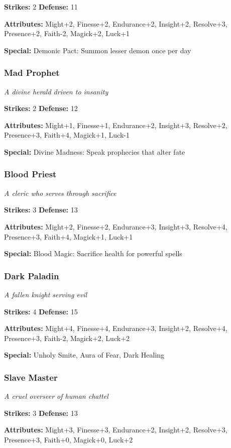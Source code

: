 \documentclass[10pt,twoside]{article}
\begin{document}
\textbf{Strikes:} 2 \quad \textbf{Defense:} 11

\textbf{Attributes:} Might+2, Finesse+2, Endurance+2, Insight+2, Resolve+3, Presence+2, Faith-2, Magick+2, Luck+1

\textbf{Special:} Demonic Pact: Summon lesser demon once per day

\subsubsection{Mad Prophet}
\textit{A divine herald driven to insanity}

\textbf{Strikes:} 2 \quad \textbf{Defense:} 12

\textbf{Attributes:} Might+1, Finesse+1, Endurance+2, Insight+3, Resolve+2, Presence+3, Faith+4, Magick+1, Luck-1

\textbf{Special:} Divine Madness: Speak prophecies that alter fate

\subsubsection{Blood Priest}
\textit{A cleric who serves through sacrifice}

\textbf{Strikes:} 3 \quad \textbf{Defense:} 13

\textbf{Attributes:} Might+2, Finesse+2, Endurance+3, Insight+3, Resolve+4, Presence+3, Faith+4, Magick+1, Luck+1

\textbf{Special:} Blood Magic: Sacrifice health for powerful spells

\subsubsection{Dark Paladin}
\textit{A fallen knight serving evil}

\textbf{Strikes:} 4 \quad \textbf{Defense:} 15

\textbf{Attributes:} Might+4, Finesse+4, Endurance+3, Insight+2, Resolve+4, Presence+3, Faith-2, Magick+2, Luck+2

\textbf{Special:} Unholy Smite, Aura of Fear, Dark Healing

\subsubsection{Slave Master}
\textit{A cruel overseer of human chattel}

\textbf{Strikes:} 3 \quad \textbf{Defense:} 13

\textbf{Attributes:} Might+3, Finesse+3, Endurance+2, Insight+2, Resolve+3, Presence+3, Faith+0, Magick+0, Luck+2
\end{document}

